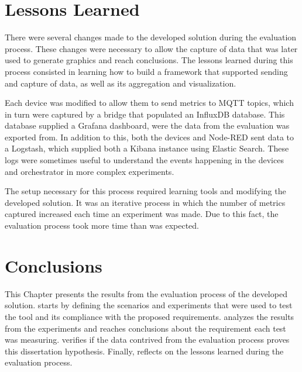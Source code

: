 \section{Lessons Learned}\label{sec:evaluation_lessons_learned}

There were several changes made to the developed solution during the evaluation process. These changes were necessary to allow the capture of data that was later used to generate graphics and reach conclusions. The lessons learned during this process consisted in learning how to build a framework that supported sending and capture of data, as well as its aggregation and visualization. 

Each device was modified to allow them to send metrics to MQTT topics, which in turn were captured by a bridge that populated an InfluxDB database. This database supplied a Grafana dashboard, were the data from the evaluation was exported from. In addition to this, both the devices and Node-RED sent data to a Logstash, which supplied both a Kibana instance using Elastic Search. These logs were sometimes useful to understand the events happening in the devices and orchestrator in more complex experiments.

The setup necessary for this process required learning tools and modifying the developed solution. It was an iterative process in which the number of metrics captured increased each time an experiment was made. Due to this fact, the evaluation process took more time than was expected.

\section{Conclusions}\label{sec:evaluation_conclusions}

This Chapter presents the results from the evaluation process of the developed solution.  starts by defining the scenarios and experiments that were used to test the tool and its compliance with the proposed requirements.  analyzes the results from the experiments and reaches conclusions about the requirement each test was measuring.  verifies if the data contrived from the evaluation process proves this dissertation hypothesis. Finally,  reflects on the lessons learned during the evaluation process. 

